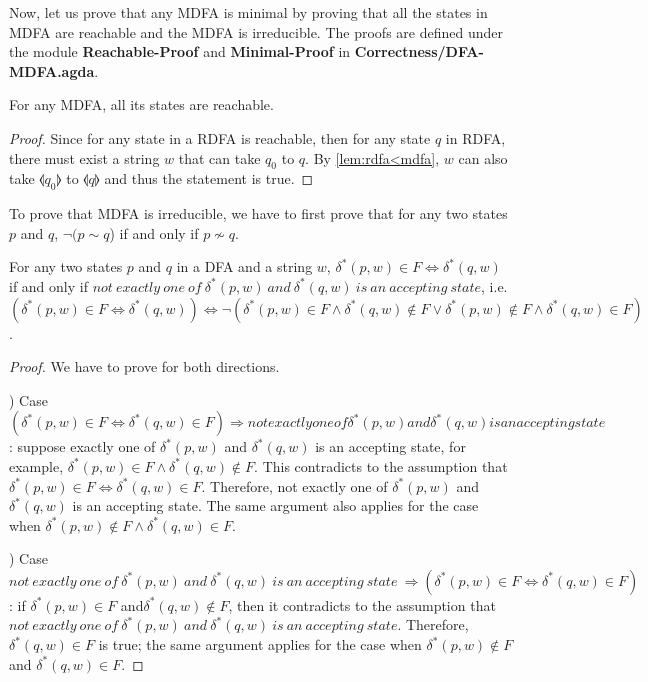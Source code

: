 \par Now, let us prove that any MDFA is minimal by proving that all the states in MDFA are reachable and the MDFA
is irreducible. The proofs are defined under the module
\textbf{Reachable-Proof} and \textbf{Minimal-Proof} in
\textbf{Correctness/DFA-MDFA.agda}. 

\begin{thm}
\label{thm:all_reach}
\noindent For any MDFA, all its states are reachable. 
\end{thm}

\begin{proof}
\noindent Since for any state in a RDFA is reachable, then for any
state \(q\) in RDFA, there must
exist a string \(w\) that can take \(q_0\) to \(q\). By
\autoref{lem:rdfa<mdfa}, \(w\) can also take \(\llangle q_0
\rrangle\) to \(\llangle q \rrangle\) and thus the statement is true. 
\end{proof}

\par To prove that MDFA is irreducible, we have to first prove
that for any two states \(p\) and \(q\), \(\neg (p \sim q\)) if and only if
\(p \nsim q\). 

\begin{lem}
\label{lem:sim_nsim1}
\noindent For any two states \(p\) and \(q\) in a DFA and a string
\(w\), \(\delta^*(p,w) \in F \Leftrightarrow \delta^*(q,w)\) if and
only if \(not\ exactly\ one\ of\ \delta^*(p,w)\ and\ \delta^*(q,w)\
is\ an\ accepting\ state\), i.e. \((\delta^*(p,w) \in F \Leftrightarrow
\delta^*(q,w)) \Leftrightarrow \neg (\delta^*(p,w) \in F \wedge \delta^*(q,w) \notin F \vee
\delta^*(p,w) \notin F \wedge \delta^*(q,w) \in F)\). 
\end{lem}

\begin{proof}
\noindent We have to prove for both directions. 

\par {}) Case \((\delta^*(p,w) \in F \Leftrightarrow
\delta^*(q,w) \in F) \Rightarrow not
exactly one of \delta^*(p,w) and \delta^*(q,w) is
an accepting state\): suppose exactly one of \(\delta^*(p,w)\) and
\(\delta^*(q,w)\) is an accepting state, for example, \(\delta^*(p,w)
\in F \wedge \delta^*(q,w) \notin F\). This contradicts to the
assumption that \(\delta^*(p,w) \in F \Leftrightarrow \delta^*(q,w) \in F\). Therefore, not
exactly one of \(\delta^*(p,w)\) and \(\delta^*(q,w)\) is
an accepting state. The same argument also applies for the case when \(\delta^*(p,w)
\notin F \wedge \delta^*(q,w) \in F\).

\par {}) Case \(not\ 
exactly\ one\ of\ \delta^*(p,w)\ and\ \delta^*(q,w)\ is\ 
an\ accepting\ state\ \Rightarrow (\delta^*(p,w) \in F \Leftrightarrow
\delta^*(q,w) \in F)\): if \(\delta^*(p,w) \in F\) and\(\delta^*(q,w) \notin
F\), then it contradicts to the assumption that \(not\ 
exactly\ one\ of\ \delta^*(p,w)\ and\ \delta^*(q,w)\ is\ 
an\ accepting\ state\). Therefore, \(\delta^*(q,w) \in F\) is true;
the same argument applies for the case when \(\delta^*(p,w) \notin F\)
and \(\delta^*(q,w) \in F\).
\end{proof}


